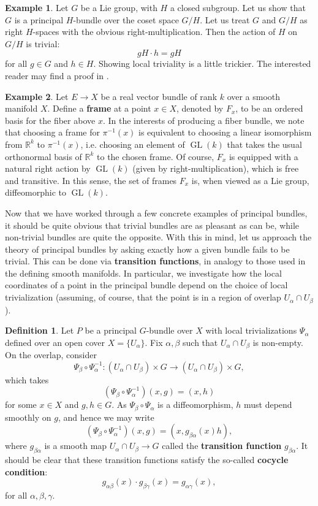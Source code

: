 \documentclass{book}
\newcommand{\R}{\mathbb{R}}
\DeclareMathOperator{\GL}{GL}
\theoremstyle{plain}
\theoremstyle{definition}
\newtheorem{defn}{Definition}
\newtheorem{exmp}{Example}
\theoremstyle{remark}
\begin{document}
\begin{exmp}
    Let $G$ be a Lie group, with $H$ a closed subgroup. Let us show that $G$ is a principal $H$-bundle over the coset space $G/H$.
    Let us treat $G$ and $G/H$ as right $H$-spaces with the obvious right-multiplication. Then the action of $H$ on $G/H$ is trivial:
    \[gH\cdot h = gH\]
    for all $g\in G$ and $h\in H$. Showing local triviality is a little trickier. The interested reader may find a proof in .
\end{exmp}

\begin{exmp}
    Let $E\to X$ be a real vector bundle of rank $k$ over a smooth manifold $X$.
    Define a \textbf{frame} at a point $x\in X$, denoted by $F_x$, to be an ordered basis for the fiber above $x$. In the interests of producing a fiber bundle,
    we note that choosing a frame for $\pi^{-1}(x)$ is equivalent to choosing a linear isomorphism from $\R^k$ to $\pi^{-1}(x)$, i.e. choosing an
    element of $\GL(k)$ that takes the usual orthonormal basis of $\R^k$ to the chosen frame. Of course, $F_x$ is equipped with a natural right action by
    $\GL(k)$ (given by right-multiplication), which is free and transitive. In this sense, the set of frames $F_x$ is, when viewed as a Lie group, diffeomorphic to $\GL(k)$.
\end{exmp}

Now that we have worked through a few concrete examples of principal bundles, it should be quite obvious that trivial bundles are as pleasant as can be,
while non-trivial bundles are quite the opposite. With this in mind, let us approach the theory of principal bundles by asking exactly how a
given bundle fails to be trivial. This can be done via \textbf{transition functions}, in analogy to those used in the defining smooth manifolds.
In particular, we investigate how the local coordinates of a point in the principal bundle depend on the choice of local trivialization (assuming, of
course, that the point is in a region of overlap $U_\alpha\cap U_\beta$).

\begin{defn}
    Let $P$ be a principal $G$-bundle over $X$ with local trivializations $\Psi_\alpha$ defined over an open cover $X=\{U_\alpha\}$.
    Fix $\alpha,\beta$ such that $U_\alpha\cap U_\beta$ is non-empty. 
    On the overlap, consider
    \[\Psi_\beta\circ\Psi_\alpha^{-1}:(U_\alpha\cap U_\beta)\times G\to (U_\alpha\cap U_\beta)\times G,\]
    which takes
    \[(\Psi_\beta\circ\Psi_\alpha^{-1})(x,g)=(x,h)\]
    for some $x\in X$ and $g,h\in G$. As $\Psi_\beta\circ\Psi_\alpha$ is a diffeomorphism, $h$ must depend smoothly on $g$,
    and hence we may write
    \[(\Psi_\beta\circ\Psi_\alpha^{-1})(x,g)=(x,g_{\beta\alpha}(x)h),\]
    where $g_{\beta\alpha}$ is a smooth map $U_\alpha\cap U_\beta\to G$ called the \textbf{transition function} $g_{\beta\alpha}$. 
    It should be clear that these transition functions satisfy the so-called \textbf{cocycle condition}:
    \[g_{\alpha\beta}(x)\cdot g_{\beta\gamma}(x)=g_{\alpha\gamma}(x),\]
    for all $\alpha,\beta,\gamma$.
\end{defn}
\end{document}
